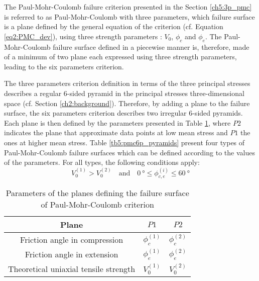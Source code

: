 The Paul-Mohr-Coulomb failure criterion presented in the Section \ref{ch5:3p_pmc} is referred to as Paul-Mohr-Coulomb with three parameters, which failure surface is a plane defined by the general equation of the criterion (cf. Equation \ref{eq2:PMC_dev}), using three strength parameters : $V_0$, $\phi_c$ and $\phi_e$. The Paul-Mohr-Coulomb failure surface defined in a piecewise manner is, therefore, made of a minimum of two plane each expressed using three strength parameters, leading to the six parameters criterion.

The three parameters criterion definition in terms of the three principal stresses describes a regular 6-sided pyramid in the principal stresses three-dimensional space (cf. Section \ref{ch2:background}). Therefore, by adding a plane to the failure surface, the six parameters criterion describes two irregular 6-sided pyramids. Each plane is then defined by the parameters presented in Table \ref{tb5:pmc6p_planeparam}, where $P2$ indicates the plane that approximate data points at low mean stress and $P1$ the ones at higher mean stress. Table \ref{tb5:pmc6p_pyramids} present four types of Paul-Mohr-Coulomb failure surfaces which can be defined according to the values of the parameters. For all types, the following conditions apply: 
\begin{equation}
    V_0^{(1)} > V_0^{(2)} \quad \textrm{and} \quad \SI{0}{\degree} \leq \phi_{c,e}^{(i)} \leq \SI{60}{\degree}
\end{equation}

\begin{table}
    \centering 
    \begin{tabular}{ccc}
        \hline 
        Plane & $P1$ & $P2$  \\
        \hline
        \hline
        Friction angle in compression & $\phi_{c}^{(1)}$ & $\phi_{c}^{(2)}$ \\
        Friction angle in extension & $\phi_{e}^{(1)}$ & $\phi_{e}^{(2)}$ \\ Theoretical uniaxial tensile strength & $V_0^{(1)}$ & $V_0^{(2)}$ \\
        \hline
    \end{tabular}
    \captionsetup{justification=centering}
    \caption{Parameters of the planes defining the failure surface of Paul-Mohr-Coulomb criterion}
    \label{tb5:pmc6p_planeparam}
\end{table}

